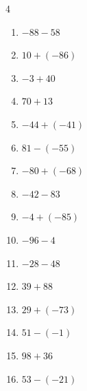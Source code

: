 \begin{multicols}{4}
\begin{enumerate}
        \phantom{$=-106$}

  \item $-88-58$

        \phantom{$=-146$}

  \item $10+(-86)$

        \phantom{$=-76$}

  \item $-3+40$

        \phantom{$=37$}

  \item $70+13$

        \phantom{$=83$}

  \item $-44+(-41)$

        \phantom{$=-85$}

  \item $81-(-55)$

        \phantom{$=136$}

\columnbreak %

  \item $-80+(-68)$

        \phantom{$=-148$}

  \item $-42-83$

        \phantom{$=-125$}

  \item $-4+(-85)$

        \phantom{$=-89$}

  \item $-96-4$

        \phantom{$=-100$}

  \item $-28-48$

        \phantom{$=-76$}

  \item $39+88$

        \phantom{$=127$}

  \item $29+(-73)$

        \phantom{$=-44$}

  \item $51-(-1)$

        \phantom{$=52$}

  \item $98+36$

        \phantom{$=134$}

  \item $53-(-21)$


\end{enumerate}
\end{multicols}
